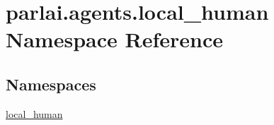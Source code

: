 \hypertarget{namespaceparlai_1_1agents_1_1local__human}{}\section{parlai.\+agents.\+local\+\_\+human Namespace Reference}
\label{namespaceparlai_1_1agents_1_1local__human}
\subsection*{Namespaces}
\begin{DoxyCompactItemize}
\item 
 \hyperlink{namespaceparlai_1_1agents_1_1local__human_1_1local__human}{local\+\_\+human}
\end{DoxyCompactItemize}
